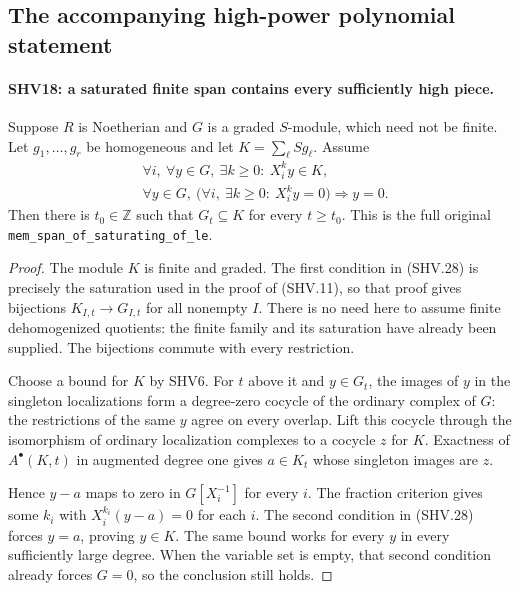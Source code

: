 \subsection{The accompanying high-power polynomial statement}

\paragraph{SHV18: a saturated finite span contains every sufficiently high piece.}
\label{claim:SHV18}
Suppose $R$ is Noetherian and $G$ is a graded $S$-module,
which need not be finite.  Let $g_1,\ldots,g_r$ be homogeneous
and let $K=\sum_\ell Sg_\ell$.  Assume
\[
 \begin{split}
 &\forall i,\ \forall y\in G,\ \exists k\ge0:\ X_i^k y\in K,\\
 &\forall y\in G,\ 
       \bigl(\forall i,\ \exists k\ge0:\ X_i^k y=0\bigr)
           \Longrightarrow y=0.
 \end{split}                                           \tag{SHV.28}
\]
Then there is $t_0\in\mathbb Z$ such that $G_t\subseteq K$
for every $t\ge t_0$.  This is the full original
\texttt{mem\_\allowbreak span\_\allowbreak of\_\allowbreak saturating\_\allowbreak of\_\allowbreak le}.

\begin{proof}
The module $K$ is finite and graded.  The first condition in
(SHV.28) is precisely the saturation used in the proof of
(SHV.11), so that proof gives bijections
$K_{I,t}\to G_{I,t}$ for all nonempty $I$.
There is no need here to assume finite dehomogenized quotients:
the finite family and its saturation have already been supplied.
The bijections commute with every restriction.

Choose a bound for $K$ by SHV6.  For $t$ above it and
$y\in G_t$, the images of $y$ in the singleton localizations
form a degree-zero cocycle of the ordinary complex of $G$:
the restrictions of the same $y$ agree on every overlap.
Lift this cocycle through the isomorphism of ordinary
localization complexes to a cocycle $z$ for $K$.
Exactness of $A^\bullet(K,t)$ in augmented degree one gives
$a\in K_t$ whose singleton images are $z$.

Hence $y-a$ maps to zero in $G[X_i^{-1}]$ for every $i$.
The fraction criterion gives some $k_i$ with
$X_i^{k_i}(y-a)=0$ for each $i$.  The second condition
in (SHV.28) forces $y=a$, proving $y\in K$.
The same bound works for every $y$ in every sufficiently
large degree.  When the variable set is empty, that second
condition already forces $G=0$, so the conclusion still holds.
\end{proof}

